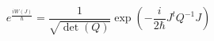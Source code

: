 \begin{equation}
\label{qclas}
e^{\frac{i W(J)}{\hbar}}
= \frac{1}{\sqrt{\det(Q)}}  \exp\left( -\frac{i}{2\hbar} J^t Q^{-1} J \right)
\end{equation}

